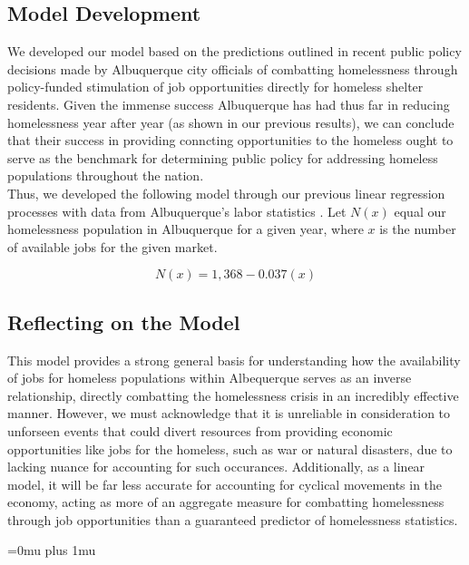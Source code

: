 \documentclass[12pt]{article}
\begin{document}
\subsection{Model Development}

We developed our model based on the predictions outlined in recent public policy decisions made by Albuquerque city
officials of combatting homelessness through policy-funded stimulation of job opportunities directly for homeless
shelter residents\cite{ALB-JOBS}. Given the immense success Albuquerque has had thus far in reducing homelessness year
after year (as shown in our previous results), we can conclude that their success in providing conncting opportunities
to the homeless ought to serve as the benchmark for determining public policy for addressing homeless populations
throughout the nation. \\

\noindent
Thus, we developed the following model through our previous linear regression processes with data from Albuquerque's
labor statistics \cite{ALB-LABOR}. Let $N(x)$ equal our homelessness population in Albuquerque for a given year, where $x$ is the
number of available jobs for the given market.

$$N(x) = 1,368-0.037(x)$$

\subsection{Reflecting on the Model}

This model provides a strong general basis for understanding how the availability of jobs for homeless populations
within Albequerque serves as an inverse relationship, directly combatting the homelessness crisis in an incredibly
effective manner. However, we must acknowledge that it is unreliable in consideration to unforseen events that could
divert resources from providing economic opportunities like jobs for the homeless, such as war or natural disasters,
due to lacking nuance for accounting for such occurances. Additionally, as a linear model, it will be far less
accurate for accounting for cyclical movements in the economy, acting as more of an aggregate measure for combatting
homelessness through job opportunities than a guaranteed predictor of homelessness statistics.

\newpage

\Urlmuskip=0mu plus 1mu\relax


\end{document}

